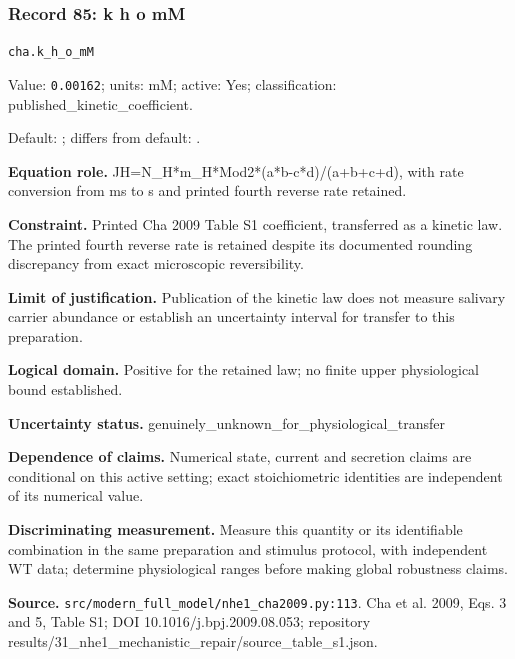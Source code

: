 \subsubsection*{Record 85: k h o mM}
{\small \nolinkurl{cha.k_h_o_mM}\par

Value: \texttt{0.00162}; units: mM; active: Yes; classification: published\_kinetic\_coefficient.\par

Default: ; differs from default: .\par

\textbf{Equation role.} JH=N\_H*m\_H*Mod2*(a*b-c*d)/(a+b+c+d), with rate conversion from ms to s and printed fourth reverse rate retained.\par

\textbf{Constraint.} Printed Cha 2009 Table S1 coefficient, transferred as a kinetic law. The printed fourth reverse rate is retained despite its documented rounding discrepancy from exact microscopic reversibility.\par

\textbf{Limit of justification.} Publication of the kinetic law does not measure salivary carrier abundance or establish an uncertainty interval for transfer to this preparation.\par

\textbf{Logical domain.} Positive for the retained law; no finite upper physiological bound established.\par

\textbf{Uncertainty status.} genuinely\_unknown\_for\_physiological\_transfer\par

\textbf{Dependence of claims.} Numerical state, current and secretion claims are conditional on this active setting; exact stoichiometric identities are independent of its numerical value.\par

\textbf{Discriminating measurement.} Measure this quantity or its identifiable combination in the same preparation and stimulus protocol, with independent WT data; determine physiological ranges before making global robustness claims.\par

\textbf{Source.} \nolinkurl{src/modern_full_model/nhe1_cha2009.py:113}. Cha et al. 2009, Eqs. 3 and 5, Table S1; DOI 10.1016/j.bpj.2009.08.053; repository results/31\_nhe1\_mechanistic\_repair/source\_table\_s1.json.\par}


